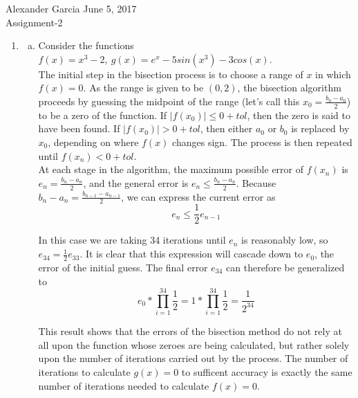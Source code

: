 \documentclass[11pt]{article}
\begin{document}
\lstset{stringstyle=\ttfamily,
	showstringspaces=false,
	basicstyle=\small}

\begin{center} Alexander Garcia \hfill June 5, 2017 \\ Assignment-2 \end{center}

\medskip

\begin{enumerate}

\item

	\begin{enumerate}[(a)]

		\item Consider the functions $f(x) = x^3 - 2,\ g(x) = e^x - 5sin(x^3) - 3cos(x)$. \\

		The initial step in the bisection process is to choose a range of $x$ in which $f(x) = 0$. As the range is given to be $(0,2)$,
		the bisection algorithm proceeds by guessing the midpoint of the range (let's call this $x_0 = \frac{b_0-a_0}{2}$) to be a zero
		of the function. If $|f(x_0)| \leq 0 + tol$, then the zero is said to have been found. If $|f(x_0)| > 0 + tol$, then either
		$a_0$ or $b_0$ is replaced by $x_0$, depending on where $f(x)$ changes sign. The process is then repeated until
		$f(x_n) < 0 + tol$. \\

		At each stage in the algorithm, the maximum possible error of $f(x_n)$ is $e_n = \frac{b_n-a_n}{2}$, and the general error is
		$e_n \leq \frac{b_n-a_n}{2}$. Because $b_n-a_n = \frac{b_{n-1}-a_{n-1}}{2}$, we can express the current error as
		$$e_n \leq \frac{1}{2} e_{n-1}$$

		In this case we are taking 34 iterations until $e_n$ is reasonably low, so $e_{34} = \frac{1}{2} e_{33}$. It is clear that this
		expression will cascade down to $e_0$, the error of the initial guess. The final error $e_{34}$ can therefore be generalized
		to
		$$e_0*\prod_{i = 1}^{34}\frac{1}{2} = 1*\prod_{i=1}^{34}\frac{1}{2} = \frac{1}{2^{34}} $$

		This result shows that the errors of the bisection method do not rely at all upon the function whose zeroes are being
		calculated, but rather solely upon the number of iterations carried out by the process. The number of iterations to calculate
		$g(x) = 0$ to sufficent accuracy is exactly the same number of iterations needed to calculate $f(x) = 0$. \\


\end{enumerate}
\end{enumerate}
\end{document}
